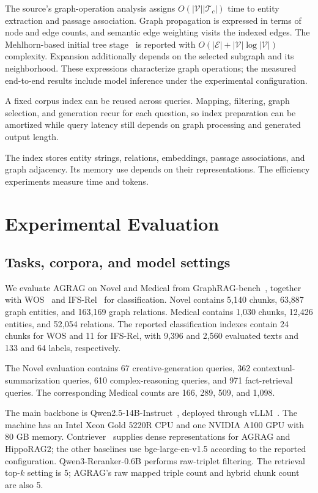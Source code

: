 The source's graph-operation analysis assigns $O(|\mathcal{V}||\mathcal{T}_c|)$ time to entity extraction and passage association. Graph propagation is expressed in terms of node and edge counts, and semantic edge weighting visits the indexed edges. The Mehlhorn-based initial tree stage~\cite{agrag-mehlhorn1988faster} is reported with $O(|\mathcal{E}|+|\mathcal{V}|\log|\mathcal{V}|)$ complexity. Expansion additionally depends on the selected subgraph and its neighborhood. These expressions characterize graph operations; the measured end-to-end results include model inference under the experimental configuration.

A fixed corpus index can be reused across queries. Mapping, filtering, graph selection, and generation recur for each question, so index preparation can be amortized while query latency still depends on graph processing and generated output length.

The index stores entity strings, relations, embeddings, passage associations, and graph adjacency. Its memory use depends on their representations. The efficiency experiments measure time and tokens.

\section{Experimental Evaluation}
\label{sec:agrag:experiments}
\subsection{Tasks, corpora, and model settings}
We evaluate AGRAG on Novel and Medical from GraphRAG-bench~\cite{agrag-xiang2025use}, together with WOS~\cite{agrag-kowsari2017hdltex} and IFS-Rel~\cite{agrag-xia-etal-2021-incremental} for classification. Novel contains 5,140 chunks, 63,887 graph entities, and 163,169 graph relations. Medical contains 1,030 chunks, 12,426 entities, and 52,054 relations. The reported classification indexes contain 24 chunks for WOS and 11 for IFS-Rel, with 9,396 and 2,560 evaluated texts and 133 and 64 labels, respectively.

The Novel evaluation contains 67 creative-generation queries, 362 contextual-summarization queries, 610 complex-reasoning queries, and 971 fact-retrieval queries. The corresponding Medical counts are 166, 289, 509, and 1,098.

The main backbone is Qwen2.5-14B-Instruct~\cite{agrag-qwen2025qwen25technicalreport}, deployed through vLLM~\cite{agrag-kwon2023efficient}. The machine has an Intel Xeon Gold 5220R CPU and one NVIDIA A100 GPU with 80 GB memory. Contriever~\cite{agrag-izacardunsupervised} supplies dense representations for AGRAG and HippoRAG2; the other baselines use bge-large-en-v1.5 according to the reported configuration. Qwen3-Reranker-0.6B performs raw-triplet filtering. The retrieval top-$k$ setting is 5; AGRAG's raw mapped triple count and hybrid chunk count are also 5.

